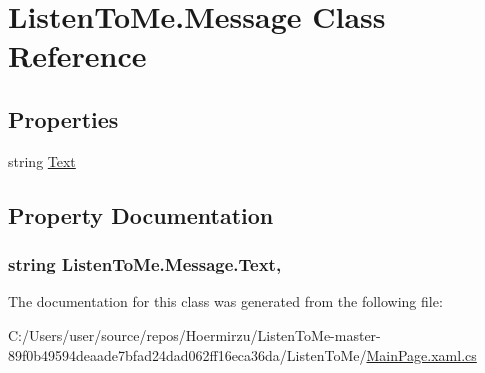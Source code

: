 \hypertarget{class_listen_to_me_1_1_message}{}\section{Listen\+To\+Me.\+Message Class Reference}
\label{class_listen_to_me_1_1_message}
\subsection*{Properties}
\begin{DoxyCompactItemize}
\item 
string \hyperlink{class_listen_to_me_1_1_message_afb419213208081b791b8759b0d712f40}{Text}
\end{DoxyCompactItemize}


\subsection{Property Documentation}
\subsubsection[{\texorpdfstring{Text}{Text}}]{\setlength{\rightskip}{0pt plus 5cm}string Listen\+To\+Me.\+Message.\+Text\hspace{0.3cm}{\ttfamily [get]}, {\ttfamily [set]}}\hypertarget{class_listen_to_me_1_1_message_afb419213208081b791b8759b0d712f40}{}\label{class_listen_to_me_1_1_message_afb419213208081b791b8759b0d712f40}


The documentation for this class was generated from the following file\+:\begin{DoxyCompactItemize}
\item 
C\+:/\+Users/user/source/repos/\+Hoermirzu/\+Listen\+To\+Me-\/master-\/89f0b49594deaade7bfad24dad062ff16eca36da/\+Listen\+To\+Me/\hyperlink{_main_page_8xaml_8cs}{Main\+Page.\+xaml.\+cs}\end{DoxyCompactItemize}
